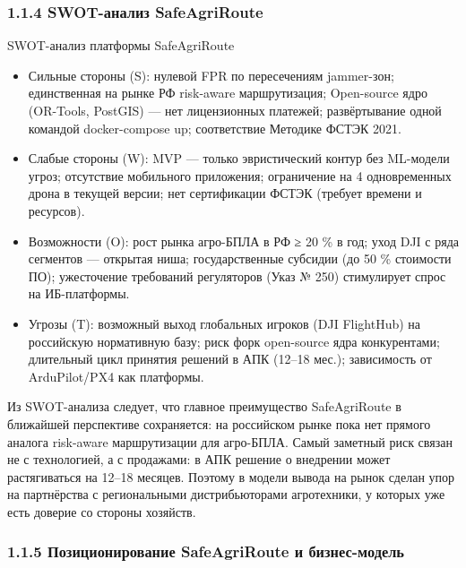 \documentclass[14pt,a4paper]{extarticle}
\begin{document}
\hypertarget{swot-ux430ux43dux430ux43bux438ux437-safeagriroute}{%
\subsubsection{1.1.4 SWOT-анализ SafeAgriRoute}\label{swot-ux430ux43dux430ux43bux438ux437-safeagriroute}}

SWOT-анализ платформы SafeAgriRoute
\begin{itemize}
\item Сильные стороны (S): нулевой FPR по пересечениям jammer-зон; единственная на рынке РФ risk-aware маршрутизация; Open-source ядро (OR-Tools, PostGIS) — нет лицензионных платежей; развёртывание одной командой docker-compose up; соответствие Методике ФСТЭК 2021.
\item Слабые стороны (W): MVP — только эвристический контур без ML-модели угроз; отсутствие мобильного приложения; ограничение на 4 одновременных дрона в текущей версии; нет сертификации ФСТЭК (требует времени и ресурсов).
\item Возможности (O): рост рынка агро-БПЛА в РФ ≥ 20 \% в год; уход DJI с ряда сегментов — открытая ниша; государственные субсидии (до 50 \% стоимости ПО); ужесточение требований регуляторов (Указ № 250) стимулирует спрос на ИБ-платформы.
\item Угрозы (T): возможный выход глобальных игроков (DJI FlightHub) на российскую нормативную базу; риск форк open-source ядра конкурентами; длительный цикл принятия решений в АПК (12–18 мес.); зависимость от ArduPilot/PX4 как платформы.
\end{itemize}


Из SWOT-анализа следует, что главное преимущество SafeAgriRoute в ближайшей перспективе сохраняется: на российском рынке пока нет прямого аналога risk-aware маршрутизации для агро-БПЛА. Самый заметный риск связан не с технологией, а с продажами: в АПК решение о внедрении может растягиваться на 12--18 месяцев. Поэтому в модели вывода на рынок сделан упор на партнёрства с региональными дистрибьюторами агротехники, у которых уже есть доверие со стороны хозяйств.

\hypertarget{ux43fux43eux437ux438ux446ux438ux43eux43dux438ux440ux43eux432ux430ux43dux438ux435-safeagriroute-ux438-ux431ux438ux437ux43dux435ux441-ux43cux43eux434ux435ux43bux44c}{%
\subsubsection{1.1.5 Позиционирование SafeAgriRoute и бизнес-модель}\label{ux43fux43eux437ux438ux446ux438ux43eux43dux438ux440ux43eux432ux430ux43dux438ux435-safeagriroute-ux438-ux431ux438ux437ux43dux435ux441-ux43cux43eux434ux435ux43bux44c}}
\end{document}
